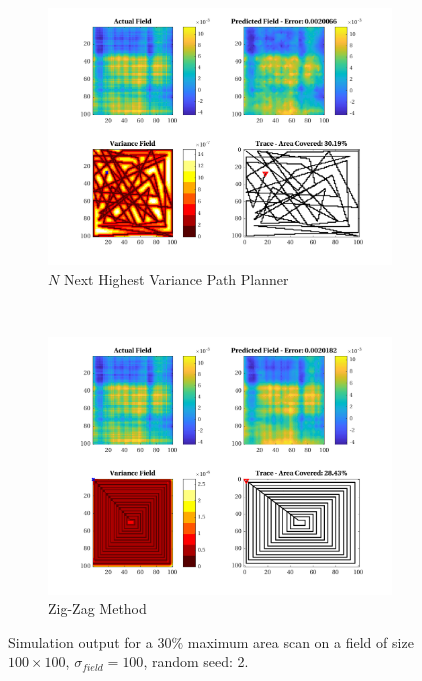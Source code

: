 \begin{figure}[htb!]
\begin{subfigure}[t]{0.5\textwidth}
    \end{subfigure}%
    \\
    \begin{subfigure}[t]{0.5\textwidth}
        \centering
        \includegraphics[width=\linewidth]{figures/hbresults/nnhv_30p_100x100_sf_100_seed_2.png}
        \captionsetup{skip=0.10\baselineskip,size=footnotesize}
        \caption{$N$ Next Highest Variance Path Planner}
    \end{subfigure}%
    ~
    \begin{subfigure}[t]{0.5\textwidth}
        \centering
        \includegraphics[width=\linewidth]{figures/hbresults/zz_30p_100x100_sf_100_seed_2.png}
        \captionsetup{skip=0.10\baselineskip,size=footnotesize}
        \caption{Zig-Zag Method}
    \end{subfigure}%
    \captionsetup{skip=0.20\baselineskip}
    \caption{Simulation output for a $30\%$ maximum area scan on a field of size $100 \times 100$, $\sigma_{field} = 100$, random seed: 2.}
    \label{fig:sim_sigma100_p30_s2}
\end{figure}

